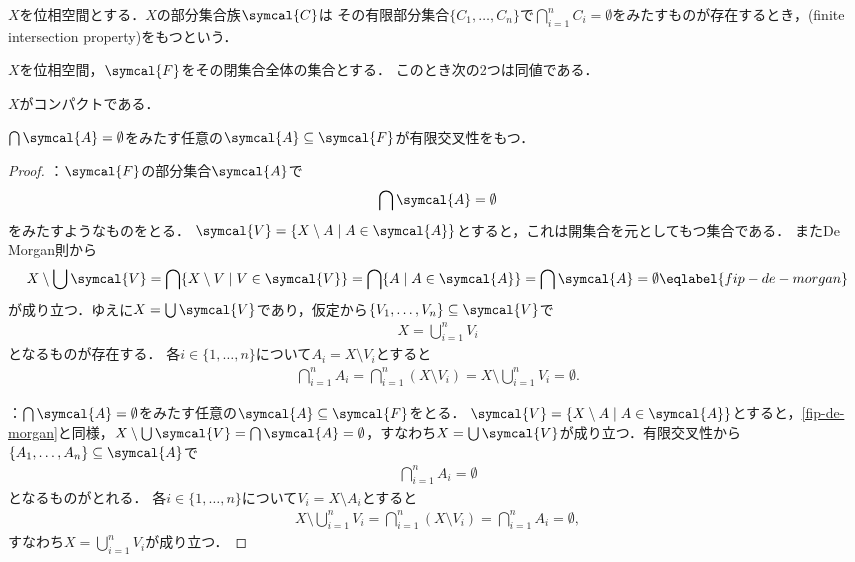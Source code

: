 \documentclass{ltjsbook}
\begin{document}
\(X\)を位相空間とする．\(X\)の部分集合族\(\symcal{C}\)は
その有限部分集合\(\{C_1, \ldots, C_n\}\)で\(\bigcap_{i = 1}^n C_i  = \emptyset\)をみたすものが存在するとき，(finite intersection property)をもつという．

\begin{thmbox}
\begin{proposition}
\(X\)を位相空間，\(\symcal{F}\)をその閉集合全体の集合とする．
このとき次の2つは同値である．
\begin{conditions}
    \item\label{fip-compact} \(X\)がコンパクトである．
    \item\label{fip-fip} \(\bigcap \symcal{A} = \emptyset\)をみたす任意の\(\symcal{A} \subseteq \symcal{F}\)が有限交叉性をもつ．
\end{conditions}
\end{proposition}
\end{thmbox}

\begin{proof} ：\(\symcal{F}\)の部分集合\(\symcal{A}\)で
\begin{align*}
    \bigcap \symcal{A} = \emptyset
\end{align*}
をみたすようなものをとる．
\(\symcal{V} = \{ X \setminus A \mid A \in \symcal{A}\}\)とすると，これは開集合を元としてもつ集合である．
またDe Morgan則から
\begin{align}
    X \setminus \bigcup \symcal{V}
    = \bigcap \{X \setminus V \mid V \in \symcal{V}\}
    = \bigcap \{A \mid A \in \symcal{A}\}
    = \bigcap \symcal{A}
    = \emptyset \eqlabel{fip-de-morgan}
\end{align}
が成り立つ．ゆえに\(X = \bigcup \symcal{V}\)であり，仮定から\(\{V_1, \ldots, V_n\} \subseteq \symcal{V}\)で
\begin{align*}
    X = \bigcup_{i = 1}^n V_i
\end{align*}
となるものが存在する．
各\(i \in \{1, \ldots, n\}\)について\(A_i = X \setminus V_i\)とすると
\begin{align*}
    \bigcap_{i = 1}^n A_i
    = \bigcap_{i = 1}^n (X \setminus V_i)
    = X \setminus \bigcup_{i = 1}^n V_i
    = \emptyset.
\end{align*}

：\(\bigcap \symcal{A} = \emptyset\)をみたす任意の\(\symcal{A} \subseteq \symcal{F}\)をとる．
\(\symcal{V} = \{X \setminus A \mid A \in \symcal{A}\}\)とすると，\eqref{fip-de-morgan}と同様，\(X \setminus \bigcup \symcal{V} = \bigcap \symcal{A} = \emptyset\)，すなわち\(X = \bigcup \symcal{V}\)が成り立つ．有限交叉性から\(\{A_1, \ldots, A_n\} \subseteq \symcal{A}\)で
\begin{align*}
    \bigcap_{i = 1}^n A_i = \emptyset
\end{align*}
となるものがとれる．
各\(i \in \{1, \ldots, n\}\)について\(V_i = X \setminus A_i\)とすると
\begin{align*}
    X \setminus \bigcup_{i = 1}^n V_i
    = \bigcap_{i = 1}^n (X \setminus V_i)
    = \bigcap_{i = 1}^n A_i
    = \emptyset, %
\end{align*}
すなわち\(X = \bigcup_{i = 1}^n V_i\)が成り立つ．
\end{proof}
\end{document}
